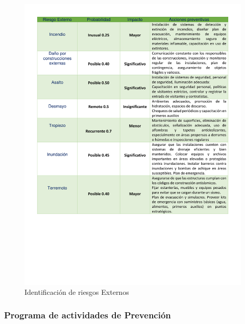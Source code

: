     \begin{figure}[H]
        \centering
        \includegraphics[scale=0.3]{32/img/riesgosExternos.pdf}
        \caption{Identificación de riesgos Externos}
        \label{fig:riesgos-externosl}
    \end{figure}
    
    \subsubsection{Programa de actividades de Prevención}
